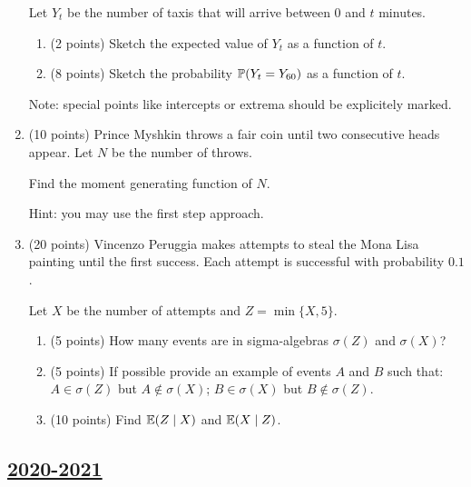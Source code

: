 \begin{enumerate}
Let $Y_t$ be the number of taxis that will arrive between 0 and $t$ minutes.

\begin{enumerate}
  \item (2 points) Sketch the expected value of $Y_t$ as a function of $t$.
  \item (8 points) Sketch the probability $\P(Y_t = Y_{60})$ as a function of $t$.
\end{enumerate}

Note: special points like intercepts or extrema should be explicitely marked.

\item (10 points) Prince Myshkin throws a fair coin until two consecutive heads appear. 
Let $N$ be the number of throws. 

Find the moment generating function of $N$. 

Hint: you may use the first step approach.

\item (20 points) Vincenzo Peruggia makes attempts to steal the Mona Lisa painting until the first 
success. 
Each attempt is successful with probability $0.1$.

Let $X$ be the number of attempts and $Z = \min\{X, 5\}$.

\begin{enumerate}
  \item (5 points) How many events are in sigma-algebras $\sigma(Z)$ and $\sigma(X)$?
  \item (5 points) If possible provide an example of events $A$ and $B$ such that: $A\in \sigma(Z)$ but $A\not\in\sigma(X)$; $B\in \sigma(X)$ but $B\not\in\sigma(Z)$.
  \item (10 points) Find $\E(Z \mid X)$ and $\E(X \mid Z)$.
\end{enumerate}






\end{enumerate}
    

\subsection[2020-2021]{\hyperref[sec:sol_kr_01_2020_2021]{2020-2021}}
\label{sec:kr_01_2020_2021} %



